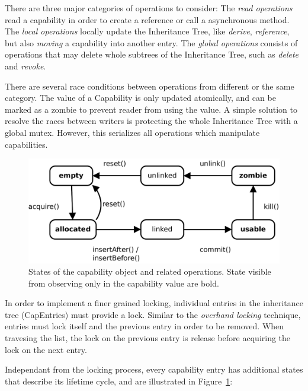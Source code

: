 There are three major categories of operations to consider: The \emph{read operations} read a capability in order to create a reference or call a asynchronous method. The \emph{local operations} locally update the Inheritance Tree, like \emph{derive}, \emph{reference}, but also \emph{moving} a capability into another entry.
The \emph{global operations} consists of operations that may delete whole subtrees of the Inheritance Tree, such as \emph{delete} and \emph{revoke}.

There are several race conditions between operations from different or the same category. The value of a Capability is only updated atomically, and can be marked as a zombie to prevent reader from using the value. A simple solution to resolve the races between writers is protecting the whole Inheritance Tree with a global mutex. However, this serializes all operations which manipulate capabilities.

\begin{figure}
  \centering
  \includegraphics[scale=0.25]{fig/capability-states.pdf}
  \caption{States of the capability object and related operations. State visible from observing only in the capability value are bold.}
  \label{fig:cap-states}
\end{figure}

In order to implement a finer grained locking, individual entries in the inheritance tree (CapEntries) must provide a lock. Similar to the \emph{overhand locking} technique, entries must lock itself and the previous entry in order to be removed. When travesing the list, the lock on the previous entry is release before acquiring the lock on the next entry.

Independant from the locking process, every capability entry has additional states that describe its lifetime cycle, and are illustrated in Figure~\ref{fig:cap-states}:

